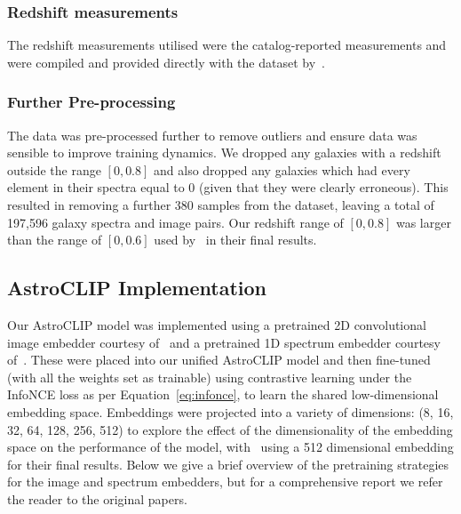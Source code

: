\subsubsection{Redshift measurements}\label{subsubsec:redshift}
The redshift measurements utilised were the catalog-reported measurements and were compiled and provided directly with the
dataset by~\cite{astroclip}.

\subsubsection{Further Pre-processing}\label{subsubsec:pre-processing}
The data was pre-processed further to remove outliers and ensure data was sensible to improve training dynamics.
We dropped any galaxies with a redshift outside the range $[0, 0.8]$ and also dropped any galaxies which had every element
in their spectra equal to 0 (given that they were clearly erroneous).
This resulted in removing a further 380 samples from the dataset, leaving a total of 197,596 galaxy spectra and image pairs.
Our redshift range of $[0, 0.8]$ was larger than the range of $[0, 0.6]$ used by~\cite{astroclip} in their final results.

\subsection{AstroCLIP Implementation}\label{subsec:astroclip-implementation}
Our AstroCLIP model was implemented using a pretrained 2D convolutional image embedder courtesy of~\cite{stein2021}
and a pretrained 1D spectrum embedder courtesy of~\cite{liang2023}.
These were placed into our unified AstroCLIP model and then fine-tuned (with all the weights set as trainable) using
contrastive learning under the InfoNCE loss as per Equation~\eqref{eq:infonce}, to learn the shared low-dimensional
embedding space.
Embeddings were projected into a variety of dimensions: (8, 16, 32, 64, 128, 256, 512) to explore the effect of the
dimensionality of the embedding space on the performance of the model, with~\cite{astroclip} using a 512 dimensional
embedding for their final results.
Below we give a brief overview of the pretraining strategies for the image and spectrum embedders, but for a
comprehensive report we refer the reader to the original papers.

